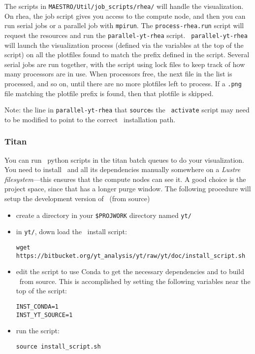 The scripts in {\tt MAESTRO/Util/job\_scripts/rhea/} will handle the
visualization.  On rhea, the job script gives you access to the
compute node, and then you can run serial jobs or a parallel job with
{\tt mpirun}.  The {\tt process-rhea.run} script will request the
resources and run the {\tt parallel-yt-rhea} script.  {\tt
parallel-yt-rhea} will launch the visualization process (defined
via the variables at the top of the script) on all the plotfiles
found to match the prefix defined in the script.  Several serial
jobs are run together, with the script using lock files to keep track
of how many processors are in use.  When processors free, the next
file in the list is processed, and so on, until there are no more
plotfiles left to process.  If a {\tt .png} file matching the
plotfile prefix is found, then that plotfile is skipped.

Note: the line in {\tt parallel-yt-rhea} that {\tt source}s the \yt\
{\tt activate} script may need to be modified to point to the
correct \yt\ installation path.


\subsubsection{Titan}

You can run \yt\ python scripts in the titan batch queues to do your
visualization.  You need to install \yt\ and all its dependencies
manually somewhere on a {\em Lustre filesystem}---this ensures that the
compute nodes can see it.  A good choice is the project space, since
that has a longer purge window.  The following procedure will setup
the development version of \yt\ (from source)
\begin{itemize}
\item create a directory in your {\tt \$PROJWORK} directory named {\tt yt/}

\item in {\tt yt/}, down load the \yt\ install script:
\begin{verbatim}
wget https://bitbucket.org/yt_analysis/yt/raw/yt/doc/install_script.sh
\end{verbatim}

\item edit the script to use Conda to get the necessary dependencies
and to build \yt\ from source.  This is accomplished by setting the 
following variables near the top of the script:
\begin{verbatim}
INST_CONDA=1
INST_YT_SOURCE=1
\end{verbatim}

\item run the script:
\begin{verbatim}
source install_script.sh
\end{verbatim}
\end{itemize}


